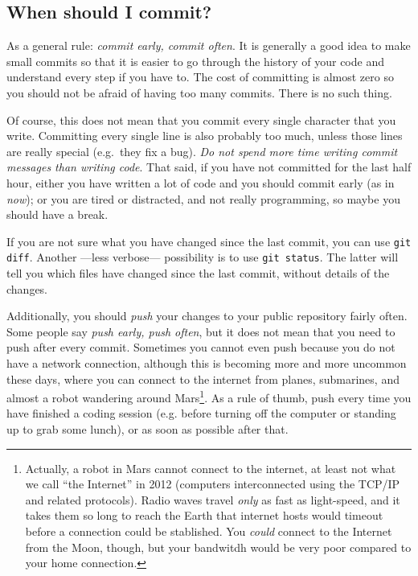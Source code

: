 \subsection{When should I commit?}
\label{sec:when-should-i}

As a general rule: \emph{commit early, commit often}. It is generally
a good idea to make small commits so that it is easier to go through
the history of your code and understand every step if you have to. The
cost of 
committing is almost zero so you should not be afraid of having too
many commits. There is no such thing. 

Of course, this does not mean that you commit every single character
that you write. Committing every single line is also probably too
much, unless those lines are really special (e.g.~they fix a bug). 
\emph{Do not spend more time
writing commit messages than writing code}. That said, if you have not
committed for the last half hour, either you have written a lot of
code and you should commit early (as in \emph{now}); or you are tired
or distracted, and not really programming, so maybe you should have a
break.

If you are not sure what you have changed since the last commit, 
you can use \verb+git diff+. Another ---less verbose--- possibility
is to use \verb+git status+. The latter will tell you
which files have changed since the last commit, without details of the
changes.

Additionally, you should \emph{push} your changes to your public
repository fairly often. Some people say \emph{push early, push
  often}, but it does not mean that you need to push after every
commit. Sometimes 
you cannot even push because you do not have a network connection,
although this is becoming more and more uncommon these days, where you
can connect to the internet from planes, submarines, and almost a
robot wandering around Mars\footnote{Actually, a robot in Mars cannot
  connect to the internet, at least not what we call ``the Internet'' 
  in 2012 (computers interconnected using the TCP/IP and related protocols). 
  Radio waves travel \emph{only} as fast as light-speed, and it
  takes them so long to reach the Earth that internet hosts would
  timeout before a connection could be stablished. 
  You \emph{could} connect to
  the Internet from the Moon, though, but your bandwitdh would be
  very poor compared to your home connection.}. 
As a rule of thumb, push every time you 
have finished a coding session (e.g. before turning off the computer
or standing up to grab some lunch), or as soon as possible after that.

